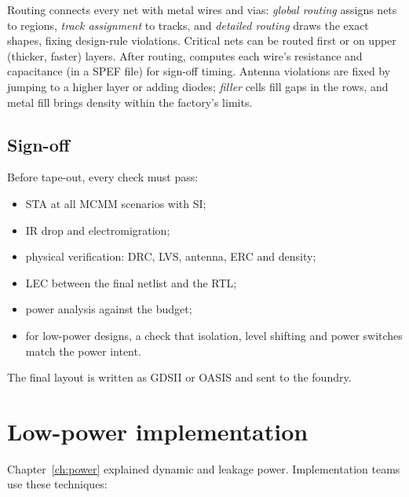 Routing connects every net with metal wires and vias: \emph{global routing} assigns nets to regions, \emph{track assignment} to tracks, and \emph{detailed routing} draws the exact shapes, fixing design-rule violations. Critical nets can be routed first or on upper (thicker, faster) layers. After routing,  computes each wire's resistance and capacitance (in a SPEF file) for sign-off timing. Antenna violations are fixed by jumping to a higher layer or adding diodes; \emph{filler} cells fill gaps in the rows, and metal fill brings density within the factory's limits.

\subsection*{Sign-off}

Before tape-out, every check must pass:
\begin{itemize}
  \item STA at all MCMM scenarios with SI;
  \item IR drop and electromigration;
  \item physical verification: DRC, LVS, antenna, ERC and density;
  \item LEC between the final netlist and the RTL;
  \item power analysis against the budget;
  \item for low-power designs, a check that isolation, level shifting and power switches match the power intent.
\end{itemize}
The final layout is written as GDSII or OASIS and sent to the foundry.

\section{Low-power implementation}

Chapter~\ref{ch:power} explained dynamic and leakage power. Implementation teams use these techniques:

